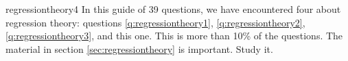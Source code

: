 \begin{answer}{regressiontheory4}
In this guide of 39 questions, we have encountered four about regression theory:
questions
\ref{q:regressiontheory1},
\ref{q:regressiontheory2},
\ref{q:regressiontheory3},
and
this one.
This is more than 10\% of the questions.
The material in section \ref{sec:regressiontheory} is important. Study it.
\end{answer}
